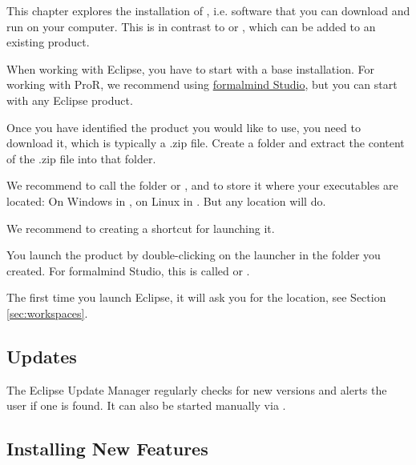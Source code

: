 This chapter explores the installation of , i.e. software that you can download and run on your computer.  This is in contrast to  or , which can be added to an existing product.

When working with Eclipse, you have to start with a base installation.  For working with ProR, we recommend using \href{http://formalmind.com/studio}{formalmind Studio}, but you can start with any Eclipse product.

Once you have identified the product you would like to use, you need to download it, which is typically a .zip file.  Create a folder and extract the content of the .zip file into that folder.

\begin{info}
We recommend to call the folder  or , and to store it where your executables are located: On Windows in , on Linux in .  But any location will do.

We recommend to creating a shortcut for launching it.
\end{info}

You launch the product by double-clicking on the launcher in the folder you created.  For formalmind Studio, this is called  or .

The first time you launch Eclipse, it will ask you for the  location, see Section \ref{sec:workspaces}.

\subsection{Updates}
\label{sec:update}

The Eclipse Update Manager regularly checks for new versions and alerts the user if one is found.  It can also be started manually via .

\subsection{Installing New Features}
\label{sec:install-add-on}


